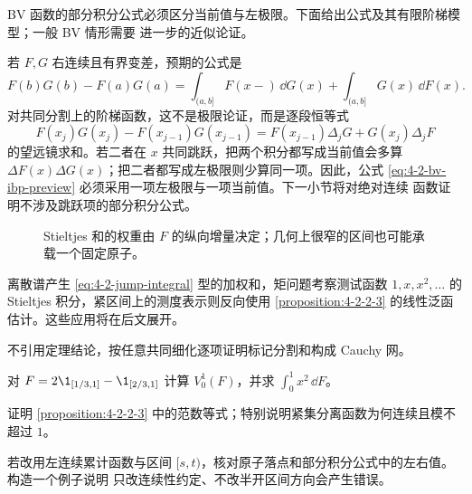 BV 函数的部分积分公式必须区分当前值与左极限。下面给出公式及其有限阶梯模型；一般 BV 情形需要
进一步的近似论证。

\begin{remark}[BV 部分积分公式的端点形式]\label{proposition:4-2-2-4}
若 $F,G$ 右连续且有界变差，预期的公式是
\begin{equation}\label{eq:4-2-bv-ibp-preview}
 F(b)G(b)-F(a)G(a)
 =\int_{(a,b]}F(x-)\,\dd G(x)
  +\int_{(a,b]}G(x)\,\dd F(x).
\end{equation}
对共同分割上的阶梯函数，这不是极限论证，而是逐段恒等式
\[
 F(x_j)G(x_j)-F(x_{j-1})G(x_{j-1})
 =F(x_{j-1})\Delta_jG+G(x_j)\Delta_jF
\]
的望远镜求和。若二者在 $x$ 共同跳跃，把两个积分都写成当前值会多算
$\Delta F(x)\Delta G(x)$；把二者都写成左极限则少算同一项。因此，公式
\eqref{eq:4-2-bv-ibp-preview} 必须采用一项左极限与一项当前值。下一小节将对绝对连续
函数证明不涉及跳跃项的部分积分公式。
\end{remark}

\begin{figure}[htbp]
\centering
{}
\caption{Stieltjes 和的权重由 $F$ 的纵向增量决定；几何上很窄的区间也可能承载一个固定原子。}
\label{fig:stieltjes-tagged-net}
\end{figure}

离散谱产生 \eqref{eq:4-2-jump-integral} 型的加权和，矩问题考察测试函数
$1,x,x^2,\ldots$ 的 Stieltjes 积分，紧区间上的测度表示则反向使用
\cref{proposition:4-2-2-3} 的线性泛函估计。这些应用将在后文展开。

\begin{exercise}
不引用定理结论，按任意共同细化逐项证明标记分割和构成 Cauchy 网。
\end{exercise}
\begin{exercise}
对 $F=2\1_{[1/3,1]}-\1_{[2/3,1]}$ 计算 $V_0^1(F)$，并求
$\int_0^1x^2\,\dd F$。
\end{exercise}
\begin{exercise}
证明 \cref{proposition:4-2-2-3} 中的范数等式；特别说明紧集分离函数为何连续且模不超过 $1$。
\end{exercise}
\begin{exercise}
若改用左连续累计函数与区间 $[s,t)$，核对原子落点和部分积分公式中的左右值。构造一个例子说明
只改连续性约定、不改半开区间方向会产生错误。
\end{exercise}

